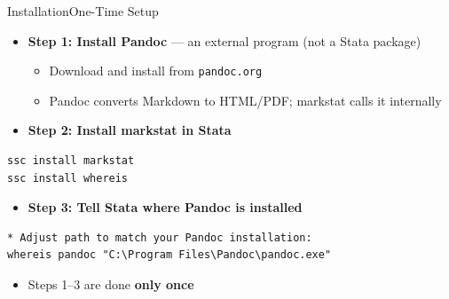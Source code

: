 \documentclass[dvipsnames,hyperref={pdfpagelabels=false}]{beamer}
\begin{document}
\begin{frame}[fragile]{Installation}{One-Time Setup}

	\begin{itemize}
		\item \textbf{Step 1: Install Pandoc} --- an external program (not a Stata package)
		\vspace{0.2cm}
		\begin{itemize}
			\item Download and install from \texttt{pandoc.org}
			\vspace{0.1cm}
			\item Pandoc converts Markdown to HTML/PDF; markstat calls it internally
		\end{itemize}
	\end{itemize}

	\vspace{0.3cm}

	\begin{itemize}
		\item \textbf{Step 2: Install markstat in Stata}
	\end{itemize}

\begin{lstlisting}
ssc install markstat
ssc install whereis
\end{lstlisting}

	\begin{itemize}
		\item \textbf{Step 3: Tell Stata where Pandoc is installed}
	\end{itemize}

\begin{lstlisting}
* Adjust path to match your Pandoc installation:
whereis pandoc "C:\Program Files\Pandoc\pandoc.exe"
\end{lstlisting}

	\begin{itemize}
		\item Steps 1--3 are done \textbf{only once}
	\end{itemize}

\end{frame}
\end{document}
